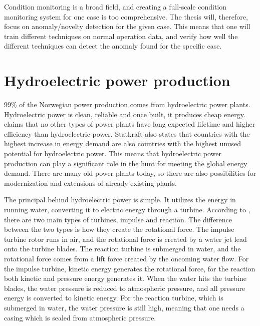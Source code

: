     Condition monitoring is a broad field, and creating a full-scale condition monitoring system for one case is too comprehensive. The thesis will, therefore, focus on anomaly/novelty detection for the given case. This means that one will train different techniques on normal operation data, and verify how well the different techniques can detect the anomaly found for the specific case. 
    
\section{Hydroelectric power production}\label{ref:sec_hydropower}
    $99\%$ of the Norwegian power production comes from hydroelectric power plants. Hydroelectric power is clean, reliable and once built, it produces cheap energy. \cite{Statkraft2009} claims that no other types of power plants have long expected lifetime and higher efficiency than hydroelectric power. Statkraft also states that countries with the highest increase in energy demand are also countries with the highest unused potential for hydroelectric power. This means that hydroelectric power production can play a significant role in the hunt for meeting the global energy demand. There are many old power plants today, so there are also possibilities for modernization and extensions of already existing plants. 
    
    The principal behind hydroelectric power is simple. It utilizes the energy in running water, converting it to electric energy through a turbine. According to \cite{Paish2002}, there are two main types of turbines, impulse and reaction. The difference between the two types is how they create the rotational force. The impulse turbine rotor runs in air, and the rotational force is created by a water jet lead onto the turbine blades. The reaction turbine is submerged in water, and the rotational force comes from a lift force created by the oncoming water flow. For the impulse turbine, kinetic energy generates the rotational force, for the reaction both kinetic and pressure energy generates it. When the water hits the turbine blades, the water pressure is reduced to atmospheric pressure, and all pressure energy is converted to kinetic energy. For the reaction turbine, which is submerged in water, the water pressure is still high, meaning that one needs a casing which is sealed from atmospheric pressure. 
    
    
